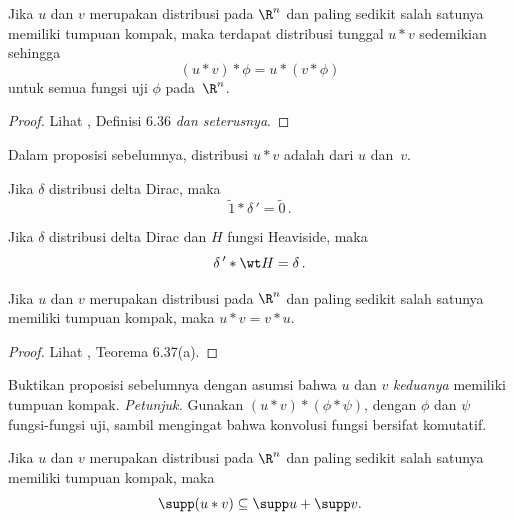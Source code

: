 \begin{prop} Jika $u$ dan $v$ merupakan distribusi pada $\R^n$ dan paling sedikit salah satunya memiliki tumpuan kompak, maka terdapat distribusi tunggal
$u \ast v$ sedemikian sehingga
   \[ (u \ast v) \ast \phi = u \ast (v \ast \phi) \]
untuk semua fungsi uji $\phi$ pada~$\R^n$.
\end{prop}

\begin{proof} Lihat \cite{Rudin:1991}, Definisi 6.36\emph{ dan seterusnya}.   \ns
\end{proof}

\begin{defn} Dalam proposisi sebelumnya, distribusi $u \ast v$ adalah
 dari $u$ dan~$v$.
\end{defn}

\begin{exam} Jika $\delta$ distribusi delta Dirac, maka
   \[ \tilde 1 \ast \delta\,' = \tilde 0\,. \]
\end{exam}

\begin{exam} Jika $\delta$ distribusi delta Dirac dan $H$ fungsi Heaviside, maka
   \[ \delta\,' \ast \wt H = \delta\,. \]
\end{exam}

\begin{prop} Jika $u$ dan $v$ merupakan distribusi pada $\R^n$ dan paling sedikit salah satunya memiliki tumpuan kompak, maka $u \ast v = v \ast u$.
\end{prop}

\begin{proof} Lihat \cite{Rudin:1991}, Teorema 6.37(a).  \ns
\end{proof}

\begin{exer} Buktikan proposisi sebelumnya dengan asumsi bahwa $u$ dan $v$ \emph{keduanya} memiliki tumpuan kompak. \emph{Petunjuk.}
Gunakan $(u \ast v) \ast (\phi \ast \psi)$, dengan $\phi$ dan $\psi$ fungsi-fungsi uji, sambil mengingat bahwa konvolusi fungsi
bersifat komutatif.
\end{exer}

\begin{prop} Jika $u$ dan $v$ merupakan distribusi pada $\R^n$ dan paling sedikit salah satunya memiliki tumpuan kompak, maka
  \[ \supp(u \ast v) \subseteq \supp u + \supp v. \]
\end{prop}

